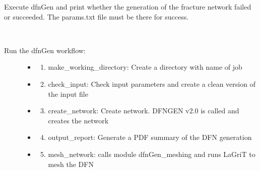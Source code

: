\documentclass[letterpaper,10pt,english]{sphinxmanual}
\begin{document}
\begin{fulllineitems}
\label{pydfnworks:pydfnworks.generator.create_network}
Execute dfnGen and print whether the generation of the fracture network failed or succeeded. The params.txt file must be there for success.

\end{fulllineitems}


\begin{fulllineitems}
\label{pydfnworks:pydfnworks.generator.dfn_gen}~\begin{description}
\item[{Run the dfnGen workflow: }] \leavevmode\begin{itemize}
\item {} \begin{enumerate}
\item {} 
make\_working\_directory: Create a directory with name of job

\end{enumerate}

\item {} \begin{enumerate}
\setcounter{enumi}{1}
\item {} 
check\_input: Check input parameters and create a clean version of the input file

\end{enumerate}

\item {} \begin{enumerate}
\setcounter{enumi}{2}
\item {} 
create\_network: Create network. DFNGEN v2.0 is called and creates the network

\end{enumerate}

\item {} \begin{enumerate}
\setcounter{enumi}{3}
\item {} 
output\_report: Generate a PDF summary of the DFN generation

\end{enumerate}

\item {} \begin{enumerate}
\setcounter{enumi}{4}
\item {} 
mesh\_network: calls module dfnGen\_meshing and runs LaGriT to mesh the DFN

\end{enumerate}

\end{itemize}

\end{description}

\end{fulllineitems}
\end{document}
